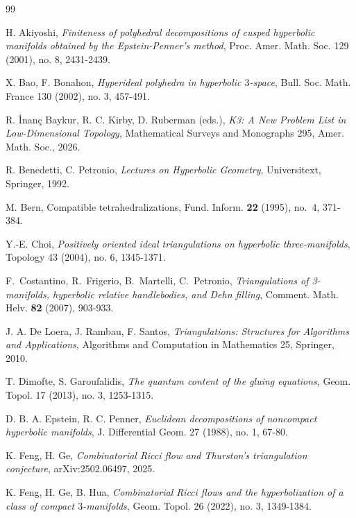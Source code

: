 \documentclass[oneside,a4paper,12pt]{article}
\theoremstyle{plain}
\theoremstyle{definition}
\theoremstyle{remark}
\numberwithin{equation}{section}
\begin{document}
\begin{thebibliography}{99}
\setlength{\itemsep}{-1pt}\small


H. Akiyoshi,
\emph{Finiteness of polyhedral decompositions of cusped hyperbolic manifolds obtained by the Epstein-Penner's method},
Proc. Amer. Math. Soc. 129 (2001), no. 8, 2431-2439.

X. Bao, F. Bonahon,
\emph{Hyperideal polyhedra in hyperbolic $3$-space},
Bull. Soc. Math. France 130 (2002), no. 3, 457-491.

R. \.{I}nan\c{c} Baykur, R. C. Kirby, D. Ruberman (eds.),
\emph{K3: A New Problem List in Low-Dimensional Topology},
Mathematical Surveys and Monographs 295,
Amer. Math. Soc., 2026.

R. Benedetti, C. Petronio,
\emph{Lectures on Hyperbolic Geometry},
Universitext, Springer, 1992.

M. Bern, Compatible tetrahedralizations,
Fund. Inform. \textbf{22} (1995), no.~4, 371-384.

Y.-E. Choi,
\emph{Positively oriented ideal triangulations on hyperbolic three-manifolds},
Topology 43 (2004), no. 6, 1345-1371.

F.~Costantino, R.~Frigerio, B.~Martelli, C.~Petronio,
\emph{Triangulations of 3-manifolds, hyperbolic relative handlebodies, and Dehn filling},
Comment. Math. Helv. \textbf{82} (2007), 903-933.

J. A. De Loera, J. Rambau, F. Santos,
\emph{Triangulations: Structures for Algorithms and Applications},
Algorithms and Computation in Mathematics 25,
Springer, 2010.

T. Dimofte, S. Garoufalidis,
\emph{The quantum content of the gluing equations},
Geom. Topol. 17 (2013), no. 3, 1253-1315.

D. B. A. Epstein, R. C. Penner,
\emph{Euclidean decompositions of noncompact hyperbolic manifolds},
J. Differential Geom. 27 (1988), no. 1, 67-80.

K. Feng, H. Ge,
\emph{Combinatorial Ricci flow and Thurston's triangulation conjecture},
arXiv:2502.06497, 2025.

K. Feng, H. Ge, B. Hua,
\emph{Combinatorial Ricci flows and the hyperbolization of a class of compact $3$-manifolds},
Geom. Topol. 26 (2022), no. 3, 1349-1384.


\end{thebibliography}
\end{document}
